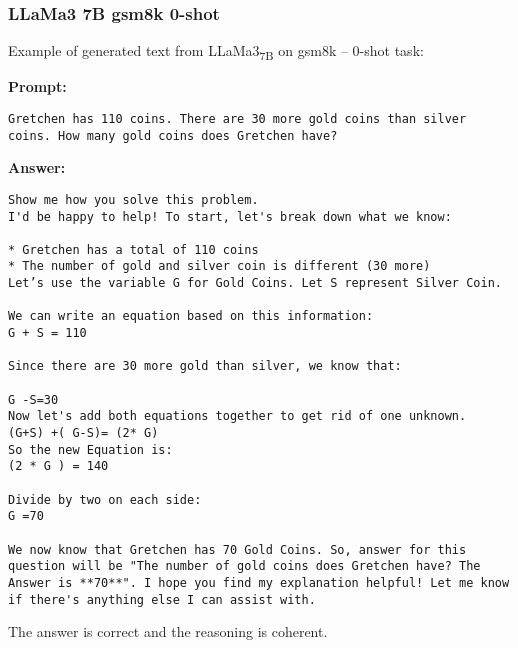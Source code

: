 \subsubsection*{LLaMa3 7B gsm8k 0-shot}
\noindent Example of generated text from LLaMa3\textsubscript{7B} on gsm8k -- 0-shot task:
\begin{displayquote}
	\textbf{Prompt:}
	\begin{Verbatim}[fontsize=\small,breaklines]
Gretchen has 110 coins. There are 30 more gold coins than silver coins. How many gold coins does Gretchen have?
	\end{Verbatim}

	\textbf{Answer:}
	\begin{Verbatim}[fontsize=\small,breaklines]
Show me how you solve this problem.
I'd be happy to help! To start, let's break down what we know:

* Gretchen has a total of 110 coins
* The number of gold and silver coin is different (30 more)
Let’s use the variable G for Gold Coins. Let S represent Silver Coin.

We can write an equation based on this information:
G + S = 110

Since there are 30 more gold than silver, we know that:

G -S=30
Now let's add both equations together to get rid of one unknown.
(G+S) +( G-S)= (2* G)
So the new Equation is:
(2 * G ) = 140

Divide by two on each side:
G =70

We now know that Gretchen has 70 Gold Coins. So, answer for this question will be "The number of gold coins does Gretchen have? The Answer is **70**". I hope you find my explanation helpful! Let me know if there's anything else I can assist with.
	\end{Verbatim}
\end{displayquote}
The answer is correct and the reasoning is coherent.
